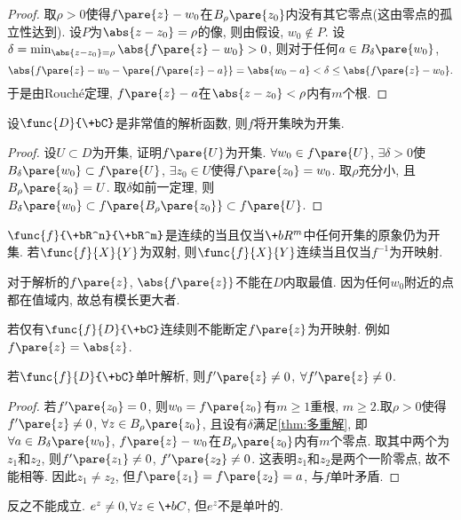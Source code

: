 \documentclass[../ComplexVariable.tex]{subfiles}
\begin{document}
\begin{proof}
    取$\rho > 0$使得$f\pare{z} - w_0$在$B_\rho\pare{z_0}$内没有其它零点(这由零点的孤立性达到). 设$P$为$\abs{z-z_0} = \rho$的像, 则由假设, $w_0 \notin P$. 设$\delta = \min_{\abs{z-z_0} = \rho} \abs{f\pare{z} - w_0} > 0$, 则对于任何$a\in B_\delta\pare{w_0}$,
    \[ \abs{f\pare{z} - w_0 - \pare{f\pare{z} - a}} = \abs{w_0 - a} < \delta \le \abs{f\pare{z} - w_0}. \]
    于是由Rouch\'e定理, $f\pare{z} - a$在$\abs{z-z_0}<\rho$内有$m$个根.
\end{proof}
\begin{corollary}[开映射定理]
    设$\func{D}{\+bC}$是非常值的解析函数, 则$f$将开集映为开集.
\end{corollary}
\begin{proof}
    设$U\subset D$为开集, 证明$f\pare{U}$为开集. $\forall w_0 \in f\pare{U}$, $\exists \delta > 0$使$B_\delta\pare{w_0} \subset f\pare{U}$, $\exists z_0 \in U$使得$f\pare{z_0} = w_0$. 取$\rho$充分小, 且$B_\rho\pare{z_0} = U$. 取$\delta$如前一定理, 则$B_\delta\pare{w_0} \subset f\pare{B_\rho\pare{z_0}}\subset f\pare{U}$.
\end{proof}
\begin{remark}
    $\func{f}{\+bR^n}{\+bR^m}$是连续的当且仅当$\+bR^m$中任何开集的原象仍为开集. 若$\func{f}{X}{Y}$为双射, 则$\func{f}{X}{Y}$连续当且仅当$f^{-1}$为开映射.
\end{remark}
\begin{ex}
    对于解析的$f\pare{z}$, $\abs{f\pare{z}}$不能在$D$内取最值. 因为任何$w_0$附近的点都在值域内, 故总有模长更大者.
\end{ex}
\begin{remark}
    若仅有$\func{f}{D}{\+bC}$连续则不能断定$f\pare{z}$为开映射. 例如$f\pare{z} = \abs{z}$.
\end{remark}
\begin{corollary}
    若$\func{f}{D}{\+bC}$单叶解析, 则$f'\pare{z}\neq 0$, $\forall f'\pare{z} \neq 0$.
\end{corollary}
\begin{proof}
    若$f'\pare{z_0} = 0$, 则$w_0 = f\pare{z_0}$有$m\ge 1$重根, $m\ge 2$.取$\rho > 0$使得$f'\pare{z}\neq 0$, $\forall z\in B_\rho\pare{z_0}$, 且设有$\delta$满足\cref{thm:多重解}, 即$\forall a\in B_\delta\pare{w_0}$, $f\pare{z} - w_0$在$B_\rho\pare{z_0}$内有$m$个零点. 取其中两个为$z_1$和$z_2$, 则$f'\pare{z_1} \neq 0$, $f'\pare{z_2}\neq 0$. 这表明${z_1}$和${z_2}$是两个一阶零点, 故不能相等. 因此$z_1\neq z_2$, 但$f\pare{z_1} = f\pare{z_2} = a$, 与$f$单叶矛盾.
\end{proof}
\begin{remark}
    反之不能成立. $e^z\neq 0, \forall z\in \+bC$, 但$e^z$不是单叶的.
\end{remark}
\end{document}
